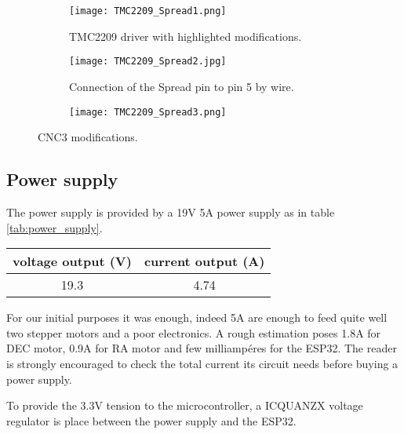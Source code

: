 \begin{figure*}
    \begin{subfigure}[t!]
        {0.33\textwidth}
        \centering
        \texttt{[image: TMC2209\_Spread1.png]}
        \caption{TMC2209 driver with highlighted modifications. }
        \label{fig:tmc-spread1}
    \end{subfigure}
    \begin{subfigure}[t!]
        {0.33\textwidth}
        \centering
        \texttt{[image: TMC2209\_Spread2.jpg]}
        \caption{Connection of the Spread pin to pin 5 by wire.}
        \label{fig:tmc-spread2}
    \end{subfigure}
    \begin{subfigure}[t!]
        {0.33\textwidth}
        \centering
        \texttt{[image: TMC2209\_Spread3.png]}
        \label{fig:tmc-spread3}
    \end{subfigure}
    \caption{CNC3 modifications.}
    \label{fig:cnc3-mod}    
\end{figure*}

\subsection{Power supply}
The power supply is provided by a 19V 5A power supply as in table \ref{tab:power_supply}.

\begin{minipage}
    {.4\textwidth}
    \begin{tabular}{cc}
         voltage output (V) & current output (A) \\
         \hline
        19.3 & 4.74 \\
    \end{tabular}
    \label{tab:power_supply}
\end{minipage}

For our initial purposes it was enough, indeed 5A are enough to feed quite well two stepper motors and a poor electronics.
A rough estimation poses 1.8A for DEC motor, 0.9A for RA motor and few milliampéres for the ESP32. 
The reader is strongly encouraged to check the total current its circuit needs before buying a power supply.

To provide the 3.3V tension to the microcontroller, a ICQUANZX voltage regulator is place between the power supply and the ESP32.

